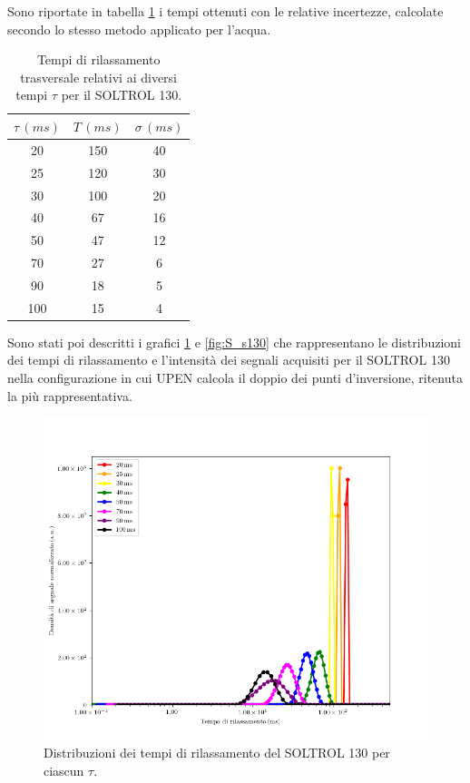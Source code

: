 Sono riportate in tabella \ref{tab:T_s130} i tempi ottenuti con le relative incertezze, calcolate secondo lo stesso metodo applicato per l'acqua.

\begin{table}[h!]
    \begin{center}
    \begin{tabular}{c c c}
    \toprule
    	${\tau}\,(ms)$ & $T\,(ms)$ & ${\sigma}\,(ms)$ \\
    \midrule
	 20 & 150 & 40 \\
	 25 & 120 & 30 \\
	 30 & 100 & 20 \\
	 40 & 67 & 16 \\
	 50 & 47 & 12 \\
	 70 & 27 & 6 \\
	 90 & 18 & 5 \\
	 100 & 15 & 4 \\
    \bottomrule
    \end{tabular}
    \caption{Tempi di rilassamento trasversale relativi ai diversi tempi $\tau$ per il SOLTROL 130.}
    \label{tab:T_s130}
    \end{center}
\end{table}

Sono stati poi descritti i grafici \ref{fig:D_s130} e \ref{fig:S_s130} che rappresentano le distribuzioni dei tempi di rilassamento e l'intensità dei segnali acquisiti per il SOLTROL 130 nella configurazione in cui UPEN calcola il doppio dei punti d'inversione, ritenuta la più rappresentativa.

\begin{figure}[h!]
\centering
\includegraphics[scale=0.3]{Figure/SOLTROL130.png}
\caption{Distribuzioni dei tempi di rilassamento del SOLTROL 130 per ciascun $\tau$.}
\label{fig:D_s130}
\end{figure}

